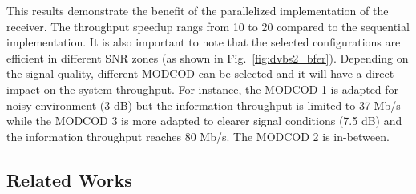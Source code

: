 This results demonstrate the benefit of the parallelized implementation of the
receiver. The throughput speedup rangs from 10 to 20 compared to the sequential
implementation. It is also important to note that the selected configurations
are efficient in different SNR zones (as shown in Fig.~\ref{fig:dvbs2_bfer}).
Depending on the signal quality, different MODCOD can be selected and it will
have a direct impact on the system throughput. For instance, the MODCOD 1 is
adapted for noisy environment (3 dB) but the information throughput is limited
to 37 Mb/s while the MODCOD 3 is more adapted to clearer signal conditions
(7.5 dB) and the information throughput reaches 80 Mb/s. The MODCOD 2 is
in-between.

\subsection{Related Works}


